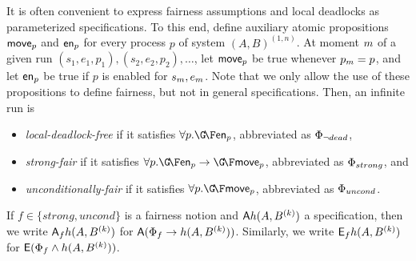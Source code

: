 It is often convenient to express fairness assumptions and local deadlocks 
as parameterized specifications.
To this end,
define auxiliary atomic propositions ${{\sf move}}_p$ and ${{\sf en}}_p$ for every process $p$ of system $(A,B)^{(1,n)}$. At moment $m$ of a given run $(s_1,e_1,p_1),(s_2,e_2,p_2), \ldots$, let ${{\sf move}}_p$ be true whenever $p_m = p$, and let ${{\sf en}}_p$ be true if $p$ is enabled for $s_m, e_m$. Note that we only allow the use of these propositions to define fairness, but not in general specifications.
Then, an infinite run is 
\begin{itemize}
\item \emph{local-deadlock-free} if it satisfies $\forall{p}. \GF \enabled_p$, abbreviated as $\Phi_{\neg dead}$,
\item \emph{strong-fair} if it satisfies $\forall{p}. \GF \enabled_p \impl \GF \sched_p$, abbreviated as $\Phi_{strong}$, and 
\item \emph{unconditionally-fair} if it satisfies $\forall{p}. \GF \sched_p$, abbreviated as $\Phi_{uncond}$.
\end{itemize}

If $f \in \{strong, uncond\}$ is a fairness notion and 
${\operatorname{\mathsf{A}}} h(A,B^{(k)})$
a specification, then we write
${\operatorname{\mathsf{A}}}_{f} h(A,B^{(k)})$ for ${\operatorname{\mathsf{A}}} (\Phi_{f} 
\rightarrow h(A,B^{(k)}))$.
Similarly, we write ${\operatorname{\mathsf{E}}}_{f} h(A,B^{(k)})$ for ${\operatorname{\mathsf{E}}} (\Phi_{f} \land h(A,B^{(k)}))$.



